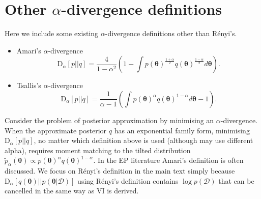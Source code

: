 \section{Other $\alpha$-divergence definitions}
\label{sec:divergence_def}

Here we include some existing $\alpha$-divergence definitions other than R{\'e}nyi's. 
\begin{itemize}
	\item Amari's $\alpha$-divergence \cite{amari:divergence}
	$$\mathrm{D}_{\alpha}[p||q] = \frac{4}{1 - \alpha^2} \left( 1 - \int p(\bm{\theta})^{\frac{1+\alpha}{2}} q(\bm{\theta})^{\frac{1-\alpha}{2}} d\bm{\theta} \right).$$
	\item Tsallis's $\alpha$-divergence \cite{tsallis:divergence}
	$$\mathrm{D}_{\alpha}[p||q] = \frac{1}{\alpha - 1} \left( \int p(\bm{\theta})^{\alpha} q(\bm{\theta})^{1 - \alpha} d\bm{\theta} - 1\right).$$
\end{itemize}

Consider the problem of posterior approximation by minimising an $\alpha$-divergence. When the approximate posterior $q$ has an exponential family form, minimising $\mathrm{D}_{\alpha}[p||q]$, no matter which definition above is used (although may use different alpha), requires moment matching to the tilted distribution $\tilde{p}_{\alpha}(\bm{\theta}) \propto p(\bm{\theta})^{\alpha} q(\bm{\theta})^{1-\alpha}$. In the EP literature Amari's definition is often discussed. We focus on R{\'e}nyi's definition in the main text simply because $\mathrm{D}_{\alpha}[q(\bm{\theta})||p(\bm{\theta}|\mathcal{D})]$ using R{\'e}nyi's definition contains $\log p(\mathcal{D})$ that can be cancelled in the same way as VI is derived.